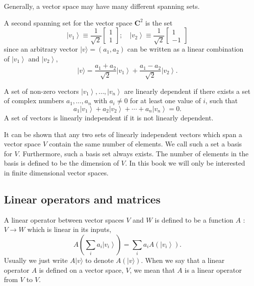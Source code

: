 \documentclass[
	11pt, %
	fleqn, %
	a4paper, %
]{LegrandOrangeBook}
\begin{document}
Generally, a vector space may have many different spanning sets. 

\begin{example}
A second spanning set for the vector space $\mathbf{C}^{2}$ is the set
$$
\left|v_{1}\right\rangle \equiv \frac{1}{\sqrt{2}}\left[\begin{array}{l}
1 \\
1
\end{array}\right] ; \quad\left|v_{2}\right\rangle \equiv \frac{1}{\sqrt{2}}\left[\begin{array}{r}
1 \\
-1
\end{array}\right]
$$
since an arbitrary vector $|v\rangle=\left(a_{1}, a_{2}\right)$ can be written as a linear combination of $\left|v_{1}\right\rangle$ and $\left|v_{2}\right\rangle$,
$$
|v\rangle=\frac{a_{1}+a_{2}}{\sqrt{2}}\left|v_{1}\right\rangle+\frac{a_{1}-a_{2}}{\sqrt{2}}\left|v_{2}\right\rangle.
$$
\end{example}

A set of non-zero vectors $\left|v_{1}\right\rangle, \ldots,\left|v_{n}\right\rangle$ are linearly dependent if there exists a set of complex numbers $a_{1}, \ldots, a_{n}$ with $a_{i} \neq 0$ for at least one value of $i$, such that
$$
a_{1}\left|v_{1}\right\rangle+a_{2}\left|v_{2}\right\rangle+\cdots+a_{n}\left|v_{n}\right\rangle=0.
$$
A set of vectors is linearly independent if it is not linearly dependent. 

It can be shown that any two sets of linearly independent vectors which span a vector space $V$ contain the same number of elements. We call such a set a basis for $V$. Furthermore, such a basis set always exists. The number of elements in the basis is defined to be the dimension of $V$. In this book we will only be interested in finite dimensional vector spaces. 


\subsection{Linear operators and matrices} %

A linear operator between vector spaces $V$ and $W$ is defined to be a function $A$ : $V \rightarrow W$ which is linear in its inputs,
\begin{equation}\label{eq:linear-operator}
A\left(\sum_{i} a_{i}\left|v_{i}\right\rangle\right)=\sum_{i} a_{i} A\left(\left|v_{i}\right\rangle\right).
\end{equation}
Usually we just write $A|v\rangle$ to denote $A(|v\rangle)$. When we say that a linear operator $A$ is defined on a vector space, $V$, we mean that $A$ is a linear operator from $V$ to $V$. 
\end{document}
